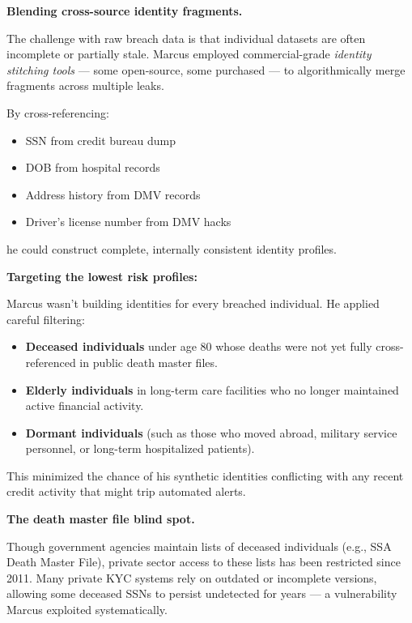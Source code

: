 \medskip

\textbf{Blending cross-source identity fragments.}

The challenge with raw breach data is that individual datasets are often incomplete or partially stale. Marcus employed commercial-grade \textit{identity stitching tools} --- some open-source, some purchased --- to algorithmically merge fragments across multiple leaks.

\medskip

By cross-referencing:

\begin{itemize}
    \item SSN from credit bureau dump
    \item DOB from hospital records
    \item Address history from DMV records
    \item Driver’s license number from DMV hacks
\end{itemize}

he could construct complete, internally consistent identity profiles.

\medskip

\textbf{Targeting the lowest risk profiles:}

Marcus wasn’t building identities for every breached individual. He applied careful filtering:

\begin{itemize}
    \item \textbf{Deceased individuals} under age 80 whose deaths were not yet fully cross-referenced in public death master files.
    \item \textbf{Elderly individuals} in long-term care facilities who no longer maintained active financial activity.
    \item \textbf{Dormant individuals} (such as those who moved abroad, military service personnel, or long-term hospitalized patients).
\end{itemize}

This minimized the chance of his synthetic identities conflicting with any recent credit activity that might trip automated alerts.

\medskip

\textbf{The death master file blind spot.}

Though government agencies maintain lists of deceased individuals (e.g., SSA Death Master File), private sector access to these lists has been restricted since 2011. Many private KYC systems rely on outdated or incomplete versions, allowing some deceased SSNs to persist undetected for years — a vulnerability Marcus exploited systematically.

